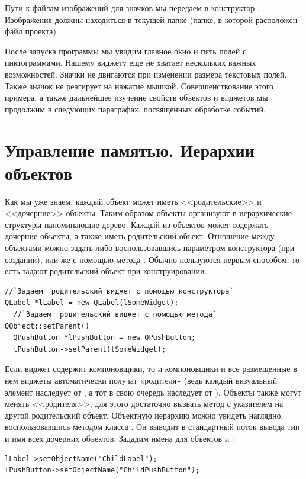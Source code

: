 Пути к файлам изображений для значков мы передаем в конструктор . Изображения
должны находиться в текущей папке (папке, в которой расположен файл проекта).

После запуска программы мы увидим главное окно и пять полей с пиктограммами. Нашему виджету еще не хватает нескольких
важных возможностей. Значки не двигаются при изменении размера текстовых полей. Также значок не реагирует на нажатие
мышкой. Совершенствование этого примера, а также дальнейшее изучение свойств объектов и виджетов мы продолжим в
следующих параграфах, посвященных обработке событий.

\section[Управление памятью. Иерархии объектов]{Управление памятью. Иерархии объектов}
Как мы уже знаем, каждый объект может иметь <<родительские>> и <<дочерние>> объекты.
Таким образом объекты организуют в иерархические структуры напоминающие дерево. Каждый из объектов может содержать
дочерние объекты, а также иметь родительский объект. Отношение между объектами можно задать либо воспользовавшись
параметром конструктора (при создании), или же с помощью метода . Обычно пользуются первым
способом, то есть задают родительский объект при конструировании.
\begin{lstlisting}
//`Задаем  родительский виджет с помощью конструктора`
QLabel *lLabel = new QLabel(lSomeWidget);
  //`Задаем  родительский виджет с помощью метода` QObject::setParent()
  QPushButton *lPushButton = new QPushButton;
  lPushButton->setParent(lSomeWidget);
\end{lstlisting}

Если виджет содержит компоновщики, то и компоновщики и все размещенные в нем виджеты автоматически получат «родителя»
(ведь каждый визуальный элемент наследует от , а тот в свою очередь наследует от
). Объекты также могут менять <<родителя>>, для этого достаточно
вызвать метод  с указателем на другой родительский объект. Объектную иерархию можно увидеть наглядно, воспользовавшись методом  класса
. Он выводит в стандартный поток вывода тип и имя всех дочерних объектов. Зададим имена для объектов
 и :
\begin{lstlisting}
lLabel->setObjectName("ChildLabel");
lPushButton->setObjectName("ChildPushButton");
\end{lstlisting}

